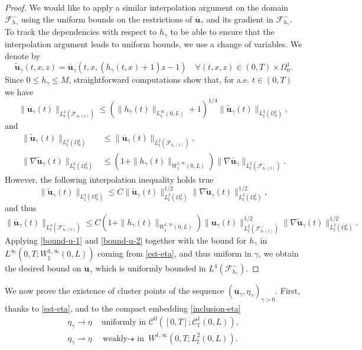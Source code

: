 \documentclass[11pt]{article}
\let\mathcal\mathscr
\theoremstyle{remark}
\theoremstyle{definition}
\newcommand{\ug}{\boldsymbol{u}}
\begin{document}
\begin{proof}
We would like to apply a similar interpolation argument on the domain $\mathcal F_{h_{\gamma}}^{-}$ using the uniform bounds on the restrictions of $\overline{\ug}_{\gamma}$ and its gradient in $\mathcal F_{h_{\gamma}}^{-}$. To track the dependencies with respect to $h_{\gamma}$ to be able to ensure that the interpolation argument leads to uniform bounds, we use a change of variables. We denote by
\[
\tilde{\ug}_{\gamma}(t,x,z) = \overline{\ug}_{\gamma}(t,x,(h_{\gamma}(t,x) + 1)z - 1 ) \quad \forall (t,x,z) \in (0,T) \times \Omega_0^1.
\]
Since $0 \leq h_{\gamma} \leq M$, straightforward computations show that, for a.e. $t \in (0,T)$ we have
\[
\|\overline{\ug}_{\gamma}(t)\|_{L_\sharp^4(\mathcal F_{h_{\gamma}(t)})} \leq (\|h_{\gamma}(t)\|_{L^{\infty}_{\sharp}(0,L)}+1)^{1/4} \|\tilde{\ug}_{\gamma}(t)\|_{L_\sharp^4( \Omega_0^1)},
\]
and
\begin{align*}
\|\tilde{\ug}_{\gamma}(t)\|_{L_\sharp^2( \Omega_0^1)} & \leq \|\overline{\ug}_{\gamma}(t)\|_{L_\sharp^2(\mathcal F_{h_{\gamma}(t)})}, \\
\|\nabla \tilde{\ug}_{\gamma}(t)\|_{L_\sharp^2( \Omega_0^1)} & \leq (1+ \|h_{\gamma}(t)\|_{W^{1,\infty}_{\sharp}(0,L)}) \|\nabla \overline{\ug}_{\gamma}\|_{L_\sharp^2(\mathcal F^-_{h_{\gamma}(t)})}.
\end{align*}
However, the following interpolation inequality holds true
\[
\|\tilde{\ug}_{\gamma}(t)\|_{L_\sharp^4( \Omega_0^1)} \leq C \|\tilde{\ug}_{\gamma}(t)\|^{1/2}_{L_\sharp^2( \Omega_0^1)}\|\nabla \tilde{\ug}_{\gamma}(t)\|^{1/2}_{L_\sharp^2( \Omega_0^1)},
\]
and thus
\[
\|\overline{\ug}_{\gamma}(t)\|_{L_\sharp^4(\mathcal F^{-}_{h_{\gamma}(t)})} \leq C(1+ \|h_{\gamma}(t)\|_{W^{1,\infty}_{\sharp}(0,L)}) \|{\ug}_{\gamma}(t)\|^{1/2}_{L_\sharp^2(\mathcal F^{-}_{h_{\gamma}(t)})}\|\nabla \tilde{\ug}_{\gamma}(t)\|^{1/2}_{L_\sharp^2(\Omega_0^1)}.
\]
Applying \eqref{bound-u-1} and \eqref{bound-u-2} together with the bound for
$h_{\gamma}$ in $L^{\infty}(0,T;W^{1,\infty}_{\sharp}(0,L))$ coming from \eqref{est-eta}, and thus uniform in $\gamma$, we obtain the desired bound on $\overline{\ug}_{\gamma}$ which is uniformly bounded in $L^4(\mathcal F^{-}_{h_{\gamma}})$. \end{proof}

We now prove the existence of cluster points of the sequence $(\overline{\ug}_{\gamma},\eta_{\gamma})_{\gamma >0}$. First, thanks to \eqref{est-eta}, and to the compact embedding \eqref{inclusion-eta}
\[
\begin{split}\textstyle
\eta_{\gamma}\to\eta& \text{ uniformly in }\mathcal{C}^{0}([0,T];\mathcal{C}^{1}_{\sharp}(0,L)),\\
\eta_{\gamma}\rightharpoonup\eta& \text{ weakly-$\star$ in }W^{1,\infty}(0,T;L^2_{\sharp}(0,L)).
\end{split}
\]
\end{document}
